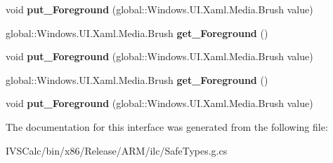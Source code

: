 \begin{DoxyCompactItemize}
\item 
\mbox{\label{interface_windows_1_1_u_i_1_1_xaml_1_1_controls_1_1_i_icon_element_a6c1f009c09bd4a70c641ee38502721f9}} 
void {\bfseries put\+\_\+\+Foreground} (global\+::\+Windows.\+U\+I.\+Xaml.\+Media.\+Brush value)
\item 
\mbox{\label{interface_windows_1_1_u_i_1_1_xaml_1_1_controls_1_1_i_icon_element_a7832c1c06d57ef178a429edea57105ac}} 
global\+::\+Windows.\+U\+I.\+Xaml.\+Media.\+Brush {\bfseries get\+\_\+\+Foreground} ()
\item 
\mbox{\label{interface_windows_1_1_u_i_1_1_xaml_1_1_controls_1_1_i_icon_element_a6c1f009c09bd4a70c641ee38502721f9}} 
void {\bfseries put\+\_\+\+Foreground} (global\+::\+Windows.\+U\+I.\+Xaml.\+Media.\+Brush value)
\item 
\mbox{\label{interface_windows_1_1_u_i_1_1_xaml_1_1_controls_1_1_i_icon_element_a7832c1c06d57ef178a429edea57105ac}} 
global\+::\+Windows.\+U\+I.\+Xaml.\+Media.\+Brush {\bfseries get\+\_\+\+Foreground} ()
\item 
\mbox{\label{interface_windows_1_1_u_i_1_1_xaml_1_1_controls_1_1_i_icon_element_a6c1f009c09bd4a70c641ee38502721f9}} 
void {\bfseries put\+\_\+\+Foreground} (global\+::\+Windows.\+U\+I.\+Xaml.\+Media.\+Brush value)
\end{DoxyCompactItemize}


The documentation for this interface was generated from the following file\+:\begin{DoxyCompactItemize}
\item 
I\+V\+S\+Calc/bin/x86/\+Release/\+A\+R\+M/ilc/Safe\+Types.\+g.\+cs\end{DoxyCompactItemize}
